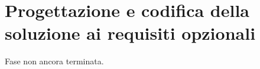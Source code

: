 \section{Progettazione e codifica della soluzione ai requisiti opzionali}

Fase non ancora terminata.